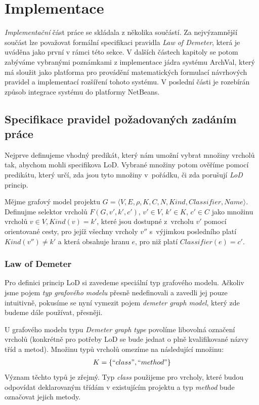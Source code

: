 \chapter{Implementace}

\emph{Implementační} část práce se skládala z několika součástí. Za nejvýzamnější součást lze považovat formální specifikaci pravidla \emph{Law of Demeter}, která je uváděna jako první v rámci této sekce. V dalších částech kapitoly se potom zabýváme vybranými poznámkami z implementace jádra systému ArchVal, který má sloužit jako platforma pro provádění matematických formulací návrhových pravidel a implementací rozšíření tohoto systému. V poslední části je rozebírán způsob integrace systému do platformy NetBeans.

\section{Specifikace pravidel požadovaných zadáním práce}
Nejprve definujeme vhodný predikát, který nám umožní vybrat množiny vrcholů tak, abychom mohli specifikova LoD. Vybrané množiny potom ověříme pomocí predikátu, který určí, zda jsou tyto množiny v~pořádku, či zda porušují \emph{LoD} princip.

\begin{definition}
Mějme grafový model projektu $G = \langle V, E, \rho, K, C, N, \mathit{Kind}, \mathit{Classifier}, \mathit{Name}\rangle$. Definujme selektor vrcholů $F(G, v', k', c')$, $v' \in V$, $k' \in K$, $c' \in C$ jako množinu vrcholů $v \in V, Kind(v) = k'$, které jsou dostupné z~vrcholu $v'$ pomocí orientované cesty, pro jejíž všechny vrcholy $v''$ s~výjimkou posledního platí $Kind(v'') \ne k'$ a která obsahuje hranu $e$, pro niž platí $Classifier(e) = c' $.
\end{definition}

\subsection{Law of Demeter}
\label{implementation-lod_specification}
Pro definici princip LoD si zavedeme speciální typ grafového modelu. Ačkoliv jsme pojem \emph{typ grafového modelu}  přesně nedefinovali a zavedli jej pouze intuitivně, pokusíme se nyní vymezit pojem \emph{demeter graph model}, který zde budeme dále používat, přesněji.

U grafového modelu typu \emph{Demeter graph type} povolíme libovolná označení vrcholů (konkrétně pro potřeby LoD se bude jednat o plně kvalifikované názvy tříd a metod). Množinu typů vrcholů omezíme na následující množinu:
\begin{align*}
K = \{ ``class", ``method" \}
\end{align*}
Význam těchto typů je zřejmý. Typ \emph{class} použijeme pro vrcholy, které budou odpovídat deklarovaným třídám v existujícím projektu a typ \emph{method} bude označovat jejich metody.

